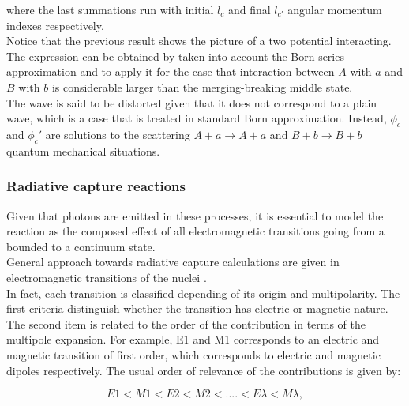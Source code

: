 \documentclass[openany]{book}
\begin{document}
where the last summations run with initial $l_{c}$ and final $l_{c'}$ angular momentum indexes respectively. \\

Notice that the previous result shows the picture of a two potential interacting. The expression can be obtained by taken into account the Born series approximation and to apply it for the case that interaction between $A$ with $a$ and $B$ with $b$ is considerable larger than the merging-breaking middle state. \\

The wave is said to be distorted given that it does not correspond to a plain wave, which is a case that is treated in standard Born approximation. Instead,  $\phi_c $ and $\phi_c'$ are solutions to the scattering $A + a \rightarrow A + a$ and $B + b \rightarrow B + b$ quantum mechanical situations. \\
 
\subsubsection{Radiative capture reactions}   \label{ssub:potential_calculations_radiativeCapture}

Given that photons are emitted in these processes, it is essential to model the reaction as the composed effect of  all electromagnetic transitions going from a bounded to a continuum state.  \\

General approach towards radiative capture calculations are given in electromagnetic transitions of the nuclei \cite{goldhaber_weneser_1955}.\\

In fact, each transition is classified depending of its origin and multipolarity. The first criteria distinguish whether the transition has electric or magnetic nature. The second item is related to the order of the contribution in terms of the multipole expansion. For example, E1 and M1 corresponds to an electric and magnetic transition of first order, which corresponds to electric and magnetic dipoles respectively. The usual order of relevance of the contributions is given by: 

\begin{equation}  \label{eq:radiativeCapture_order}
	E1 < M1 < E2 < M2 < .... < E\lambda < M\lambda,
\end{equation}
\end{document}
